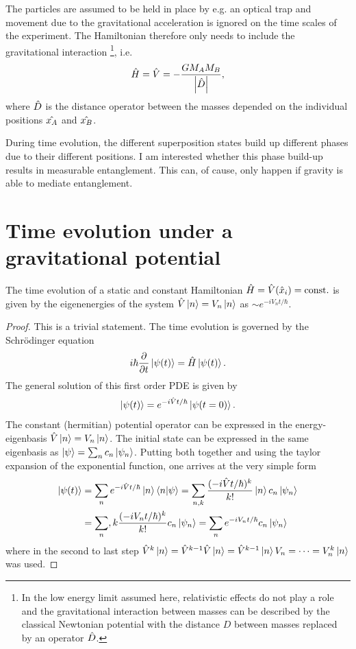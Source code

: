 The particles are assumed to be held in place by e.g. an optical trap and movement due to the gravitational acceleration is ignored on the time scales of the experiment. The Hamiltonian therefore only needs to include the gravitational interaction \footnote{In the low energy limit assumed here, relativistic effects do not play a role and the gravitational interaction between masses can be described by the classical Newtonian potential with the distance $D$ between masses replaced by an operator $\hat{D}$.}, i.e.
\begin{equation}\label{eq:2:hamiltonian}
  \hat{H} = \hat{V} = -\frac{G M_A M_B}{\left\lvert\hat{D}\right\rvert},
\end{equation}
where $\hat{D}$ is the distance operator between the masses depended on the individual positions $\hat{x_A}$ and $\hat{x_B}$.

During time evolution, the different superposition states build up different phases due to their different positions. I am interested whether this phase build-up results in measurable entanglement. This can, of cause, only happen if gravity is able to mediate entanglement.



\section{Time evolution under a gravitational potential}


\begin{proposition}
  The time evolution of a static and constant Hamiltonian $\hat{H} = \hat{V}(\hat{x}_i) = \mathrm{const.}$ is given by the eigenenergies of the system $\hat{V}\ket{n} = V_n\ket{n}$ as $\sim e^{-iV_nt/\hbar}$.
\end{proposition}
\begin{proof}
  This is a trivial statement. The time evolution is governed by the Schrödinger equation
  \begin{equation}
    i\hbar \pdv{t}\ket{\psi(t)} = \hat{H} \ket{\psi(t)} .
  \end{equation}
  The general solution of this first order PDE is given by
  \begin{equation}
    \ket{\psi(t)} = e^{-i\hat{V}t/\hbar} \ket{\psi(t=0)} .
  \end{equation}
  The constant (hermitian) potential operator can be expressed in the energy-eigenbasis $\hat{V}\ket{n} = V_n\ket{n}$. The initial state can be expressed in the same eigenbasis as $\ket{\psi} = \sum_n c_n \ket{\psi_n}$. Putting both together and using the taylor expansion of the exponential function, one arrives at the very simple form
  \begin{align}
    \ket{\psi(t)} &= \sum_n e^{-i\hat{V}t/\hbar} \ket{n} \braket{n}{\psi} = \sum_{n,k} \frac{(-i\hat{V}t/\hbar)^k}{k!} \ket{n} c_n \ket{\psi_n} \\
    &= \sum_n,k \frac{(-iV_n t/\hbar)^k}{k!} c_n \ket{\psi_n} 
    = \sum_n e^{-iV_nt/\hbar} c_n \ket{\psi_n}
  \end{align}
  where in the second to last step $\hat{V}^k\ket{n} = \hat{V}^{k-1}\hat{V}\ket{n} = \hat{V}^{k-1}\ket{n} V_n = \dots = V_n^k\ket{n}$ was used.
\end{proof}


